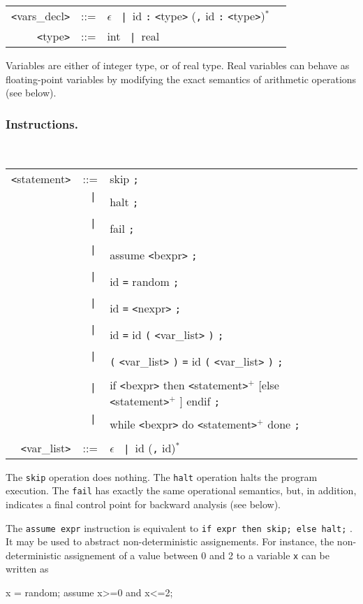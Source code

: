 \documentclass[a4paper,11pt]{article}
\newcommand{\pkw}[1]{\textcolor{progkeyword}{#1}}
\newcommand{\sx}[1]{\textcolor{prog}{\texttt{<}#1\texttt{>}}}
\newcommand{\tk}[1]{\textcolor{token}{\texttt{#1}}}
\newcommand{\sor}{\texttt{~|~}}
\newenvironment{syntax}
{
\T\medskip
\begin{tabular}{rcll}
}
{
\end{tabular}
\T\par\medskip
}
\newenvironment{prog}
{\begin{example}\color{prog}}
{\end{example}\par}
\begin{document}
\begin{syntax}
  \sx{vars\_decl} & ::= & $\epsilon$ \sor id \tk{:} \sx{type} (\tk{,} id \tk{:} \sx{type})$^*$ \\
\sx{type} & ::= & \pkw{int} \sor \pkw{real} \\
\end{syntax}
Variables are either of integer type, or of real type. Real
variables can behave as floating-point variables by modifying the
exact semantics of arithmetic operations (see below).

\subsubsection{Instructions.}\T~

\begin{syntax}
  \sx{statement} &::=& \pkw{skip} \tk{;} \\
  &\sor& \pkw{halt} \tk{;} \\
  &\sor& \pkw{fail} \tk{;} \\
  &\sor& \pkw{assume} \sx{bexpr} \tk{;} \\
  &\sor& id \tk{=} \pkw{random} \tk{;} \\
  &\sor& id \tk{=} \sx{nexpr} \tk{;} \\
  &\sor& id \tk{=} id \tk{(} \sx{var\_list} \tk{)} \tk{;} \\
  &\sor& \tk{(} \sx{var\_list} \tk{)} \tk{=} id \tk{(} \sx{var\_list} \tk{)} \tk{;} \\
  &\sor& \pkw{if} \sx{bexpr} \pkw{then} \sx{statement}$^+$ [\pkw{else} \sx{statement}$^+$ ] \pkw{endif} \tk{;} \\
  &\sor& \pkw{while} \sx{bexpr} \pkw{do} \sx{statement}$^+$ \pkw{done} \tk{;} \\
  \sx{var\_list} &::=& $\epsilon$ \sor id (\tk{,} id)$^*$
\end{syntax}

The \texttt{skip} operation does nothing.  The \texttt{halt}
operation halts the program execution. The \texttt{fail} has
exactly the same operational semantics, but, in addition,
indicates a final control point for backward analysis (see below).

The \texttt{assume expr} instruction is equivalent to \texttt{if
  expr then skip; else halt;} . It may be used to abstract
non-deterministic assignements. For instance, the
non-deterministic assignement of a value between 0 and 2 to a
variable \texttt{x} can be written as
\begin{prog}
  x = random;
  assume x>=0 and x<=2;
\end{prog}
\end{document}
